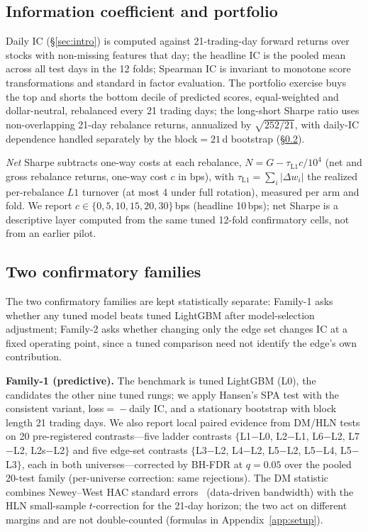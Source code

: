 \documentclass{article}
\begin{document}
\subsection{Information coefficient and portfolio}
Daily IC (\S\ref{sec:intro}) is computed against 21-trading-day forward returns over stocks with non-missing features that day; the headline IC is the pooled mean across all test days in the 12 folds; Spearman IC is invariant to monotone score transformations and standard in factor evaluation. The portfolio exercise buys the top and shorts the bottom decile of predicted scores, equal-weighted and dollar-neutral, rebalanced every 21 trading days; the long-short Sharpe ratio uses non-overlapping 21-day rebalance returns, annualized by $\sqrt{252/21}$, with daily-IC dependence handled separately by the block${}=21$\,d bootstrap (\S\ref{sec:families}).

\emph{Net} Sharpe subtracts one-way costs at each rebalance, $N=G-\tau_{\text{L1}}c/10^4$ (net and gross rebalance returns, one-way cost $c$ in bps), with $\tau_{\text{L1}}=\sum_i|\Delta w_i|$ the realized per-rebalance $L1$ turnover (at most 4 under full rotation), measured per arm and fold. We report $c\in\{0,5,10,15,20,30\}$\,bps (headline 10\,bps); net Sharpe is a descriptive layer computed from the same tuned 12-fold confirmatory cells, not from an earlier pilot.

\subsection{Two confirmatory families}\label{sec:families}
The two confirmatory families are kept statistically separate: Family-1 asks whether any tuned model beats tuned LightGBM after model-selection adjustment; Family-2 asks whether changing only the edge set changes IC at a fixed operating point, since a tuned comparison need not identify the edge's own contribution.

\textbf{Family-1 (predictive).} The benchmark is tuned LightGBM (L0), the candidates the other nine tuned rungs; we apply Hansen's SPA test with the consistent variant, loss${}={}-$daily IC, and a stationary bootstrap with block length 21 trading days. We also report local paired evidence from DM/HLN tests on 20 pre-registered contrasts---five ladder contrasts $\{$L1$-$L0, L2$-$L1, L6$-$L2, L7$-$L2, L2s$-$L2$\}$ and five edge-set contrasts $\{$L3$-$L2, L4$-$L2, L5$-$L2, L5$-$L4, L5$-$L3$\}$, each in both universes---corrected by BH-FDR at $q=0.05$ over the pooled 20-test family (per-universe correction: same rejections). The DM statistic combines Newey--West HAC standard errors~\citep{newey1987simple} (data-driven bandwidth) with the HLN small-sample $t$-correction for the 21-day horizon; the two act on different margins and are not double-counted (formulas in Appendix~\ref{app:setup}).
\end{document}
